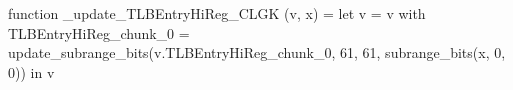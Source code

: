 function _update_TLBEntryHiReg_CLGK (v, x) = let v = { v with TLBEntryHiReg_chunk_0 = update_subrange_bits(v.TLBEntryHiReg_chunk_0, 61, 61, subrange_bits(x, 0, 0)) } in
  v
